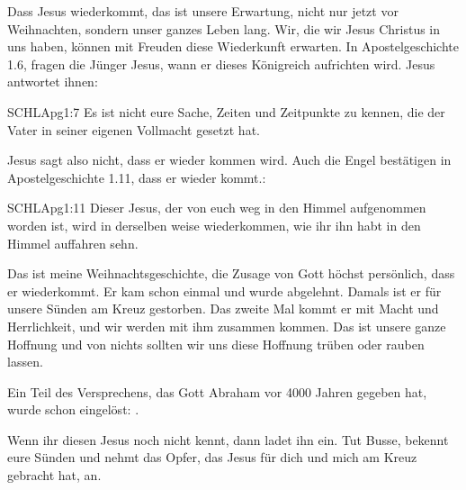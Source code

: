 \begin{otsblock}[Einführung]
    Dass Jesus wiederkommt, das ist unsere Erwartung, nicht nur jetzt vor Weihnachten, sondern unser ganzes Leben lang. Wir, die wir Jesus Christus in uns haben, können mit Freuden diese Wiederkunft erwarten.
    In Apostelgeschichte 1.6, fragen die Jünger Jesus, wann er dieses Königreich aufrichten wird. Jesus antwortet ihnen:
    \begin{bibelbox}{SCHL}{Apg}{1:7}
        Es ist nicht eure Sache, Zeiten und Zeitpunkte zu kennen, die der Vater in seiner eigenen Vollmacht gesetzt hat.    
    \end{bibelbox}
    Jesus sagt also nicht, dass er  wieder kommen wird. Auch die Engel bestätigen in Apostelgeschichte 1.11, dass er wieder kommt.:
    \begin{bibelbox}{SCHL}{Apg}{1:11}
        Dieser Jesus, der von euch weg in den Himmel aufgenommen worden ist, wird in derselben weise wiederkommen, wie ihr ihn habt in den Himmel auffahren sehn.
    \end{bibelbox}

    Das ist meine Weihnachtsgeschichte, die Zusage von Gott höchst persönlich, dass er wiederkommt. Er kam schon einmal und wurde abgelehnt. Damals ist er für unsere Sünden am Kreuz gestorben. Das zweite Mal kommt er mit Macht und Herrlichkeit, und wir werden mit ihm zusammen kommen. Das ist unsere ganze Hoffnung und von nichts sollten wir uns diese Hoffnung trüben oder rauben lassen.

    Ein Teil des Versprechens, das Gott Abraham vor 4000 Jahren gegeben hat, wurde schon eingelöst: .

    Wenn ihr diesen Jesus noch nicht kennt, dann ladet ihn ein. Tut Busse, bekennt eure Sünden und nehmt das Opfer, das Jesus für dich und mich am Kreuz gebracht hat, an.     

\end{otsblock}